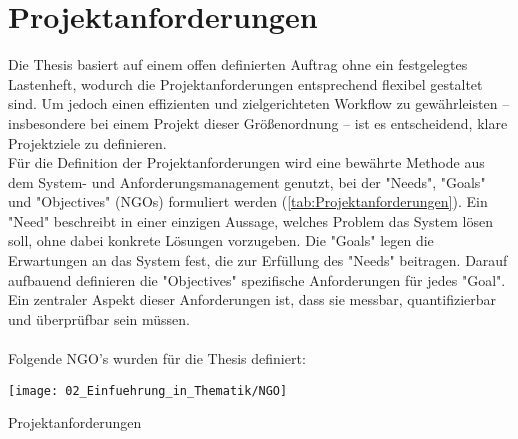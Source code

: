 \section{Projektanforderungen} \label{Projektanforderungen}

	Die Thesis basiert auf einem offen definierten Auftrag ohne ein festgelegtes Lastenheft, wodurch die Projektanforderungen entsprechend flexibel gestaltet sind. Um jedoch einen effizienten und zielgerichteten Workflow zu gewährleisten – insbesondere bei einem Projekt dieser Größenordnung – ist es entscheidend, klare Projektziele zu definieren.
	\\
	Für die Definition der Projektanforderungen wird eine bewährte Methode aus dem System- und Anforderungsmanagement genutzt, bei der "Needs", "Goals" und "Objectives" (NGOs) formuliert werden (\ref{tab:Projektanforderungen}). Ein "Need" beschreibt in einer einzigen Aussage, welches Problem das System lösen soll, ohne dabei konkrete Lösungen vorzugeben. Die "Goals" legen die Erwartungen an das System fest, die zur Erfüllung des "Needs" beitragen. Darauf aufbauend definieren die "Objectives" spezifische Anforderungen für jedes "Goal". Ein zentraler Aspekt dieser Anforderungen ist, dass sie messbar, quantifizierbar und überprüfbar sein müssen.
	\\
	\\
	Folgende NGO's wurden für die Thesis definiert: 
	
	\begin{table}[h!]
		\centering
		\texttt{[image: 02\_Einfuehrung\_in\_Thematik/NGO]}
		\caption{Projektanforderungen}
		\label{tab:Projektanforderungen}
	\end{table}
